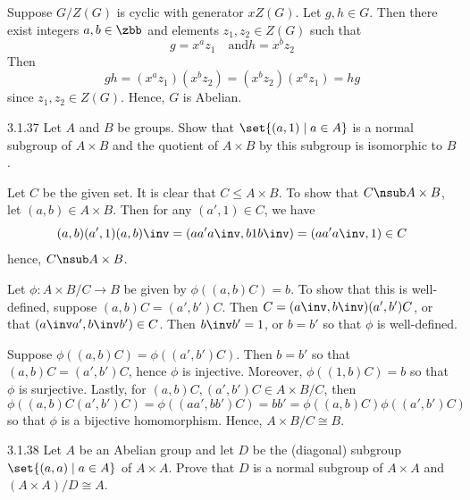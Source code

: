 \begin{sol}
    Suppose $G/Z(G)$ is cyclic with generator $xZ(G)$.
	Let $g, h \in G$.
	Then there exist integers $a, b \in \zbb$ and elements $z_1, z_2 \in Z(G)$ such that
    \[
    	g = x^a z_1 \quad \text{and} h = x^b z_2
    \]
    Then
    \[
    	gh = (x^a z_1)(x^b z_2) = (x^b z_2)(x^a z_1) = hg
    \]
    since $z_1, z_2 \in Z(G)$.
	Hence, $G$ is Abelian.
\end{sol}

\begin{exercise}{3.1.37}
    Let $A$ and $B$ be groups.
	Show that $\set{(a,1) \mid a \in A}$ is a normal subgroup of $A \times B$ and the quotient of $A \times B$ by this subgroup is isomorphic to $B$.
\end{exercise}

\begin{sol}
    Let $C$ be the given set.
	It is clear that $C \leq A \times B$.
	To show that $C \nsub A \times B$, let $(a, b) \in A \times B$.
	Then for any $(a', 1) \in C$, we have
    \[
    	(a, b)(a', 1)(a, b)\inv = (aa'a\inv, b1b\inv) = (aa'a\inv, 1) \in C
    \]
    hence, $C \nsub A \times B$.

    Let $\phi : A \times B/C \to B$ be given by $\phi((a, b)C) = b$.
	To show that this is well-defined, suppose $(a, b)C = (a', b')C$.
	Then $C = (a\inv, b\inv)(a', b')C$, or that $(a\inv a', b\inv b') \in C$.
	Then $b\inv b' = 1$, or $b = b'$ so that $\phi$ is well-defined.

    Suppose $\phi((a, b)C) = \phi((a', b')C)$.
	Then $b = b'$ so that $(a, b)C = (a', b')C$, hence $\phi$ is injective.
	Moreover, $\phi((1, b)C) = b$ so that $\phi$ is surjective.
	Lastly, for $(a, b)C, (a', b')C \in A \times B/C$, then
    \[
    	\phi((a, b)C (a', b')C) = \phi((aa', bb')C) = bb' = \phi((a, b)C)\phi((a', b')C)
    \]
    so that $\phi$ is a bijective homomorphism.
	Hence, $A \times B/C \cong B$.
\end{sol}

\begin{exercise}{3.1.38}
    Let $A$ be an Abelian group and let $D$ be the (diagonal) subgroup $\set{(a,a) \mid a \in A}$ of $A \times A$.
	Prove that $D$ is a normal subgroup of $A \times A$ and $(A \times A)/D \cong A$.
\end{exercise}

